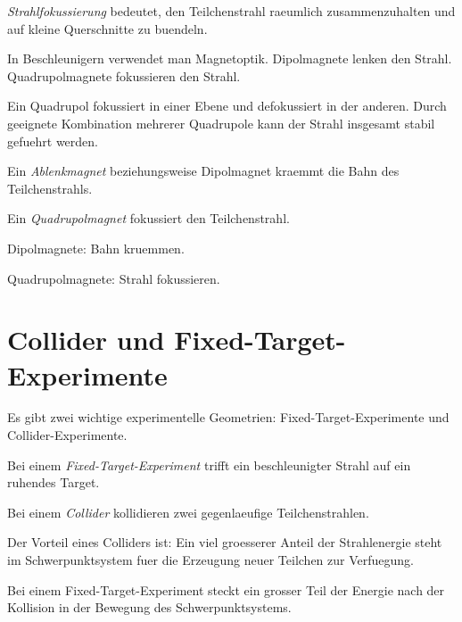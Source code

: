 \begin{definitionbox}
\emph{Strahlfokussierung} bedeutet, den Teilchenstrahl raeumlich zusammenzuhalten
und auf kleine Querschnitte zu buendeln.
\end{definitionbox}

\begin{conceptbox}
In Beschleunigern verwendet man Magnetoptik.
Dipolmagnete lenken den Strahl.
Quadrupolmagnete fokussieren den Strahl.

Ein Quadrupol fokussiert in einer Ebene und defokussiert in der anderen.
Durch geeignete Kombination mehrerer Quadrupole kann der Strahl insgesamt stabil
gefuehrt werden.
\end{conceptbox}

\begin{definitionbox}
Ein \emph{Ablenkmagnet} beziehungsweise Dipolmagnet kraemmt die Bahn des Teilchenstrahls.

Ein \emph{Quadrupolmagnet} fokussiert den Teilchenstrahl.
\end{definitionbox}

\begin{examtipbox}
Dipolmagnete:
Bahn kruemmen.

Quadrupolmagnete:
Strahl fokussieren.
\end{examtipbox}

\section{Collider und Fixed-Target-Experimente}

Es gibt zwei wichtige experimentelle Geometrien:
Fixed-Target-Experimente und Collider-Experimente.

\begin{definitionbox}
Bei einem \emph{Fixed-Target-Experiment} trifft ein beschleunigter Strahl auf ein
ruhendes Target.

Bei einem \emph{Collider} kollidieren zwei gegenlaeufige Teilchenstrahlen.
\end{definitionbox}

\begin{conceptbox}
Der Vorteil eines Colliders ist:
Ein viel groesserer Anteil der Strahlenergie steht im Schwerpunktsystem fuer die
Erzeugung neuer Teilchen zur Verfuegung.

Bei einem Fixed-Target-Experiment steckt ein grosser Teil der Energie nach der
Kollision in der Bewegung des Schwerpunktsystems.
\end{conceptbox}

